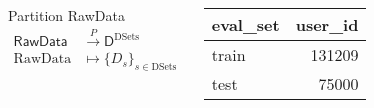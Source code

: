 \documentclass[handout]{beamer}
\begin{document}
\begin{frame}
\begin{columns}
\begin{block}{Partition RawData}
\setlength\abovedisplayskip{0pt}
\begin{equation*}\label{eq:partition-map}
\begin{split}
     \mathsf{RawData} &\xrightarrow{P} \mathsf{D}^{\textrm{DSets}} \\
     \mathrm{RawData} &\mapsto \{D_s\}_{s \in \textrm{DSets}}%
\end{split}
\end{equation*}%
\end{block}
\begin{block}{}
\centering
 \begin{tabular}{lr}
    \toprule
    eval\_set &  user\_id \\
    \midrule
    train    &   131209 \\
    test     &    75000 \\
    \bottomrule
\end{tabular}
\end{block}
\end{columns}




\end{frame}
\end{document}
